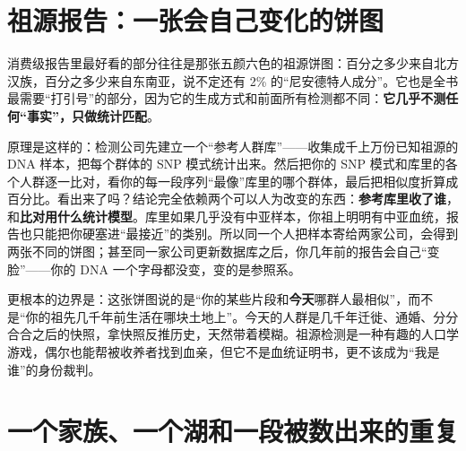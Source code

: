 \section{祖源报告：一张会自己变化的饼图}

消费级报告里最好看的部分往往是那张五颜六色的祖源饼图：百分之多少来自北方汉族，百分之多少来自东南亚，说不定还有 2\% 的“尼安德特人成分”。它也是全书最需要“打引号”的部分，因为它的生成方式和前面所有检测都不同：\textbf{它几乎不测任何“事实”，只做统计匹配}。

原理是这样的：检测公司先建立一个“参考人群库”——收集成千上万份已知祖源的 DNA 样本，把每个群体的 SNP 模式统计出来。然后把你的 SNP 模式和库里的各个人群逐一比对，看你的每一段序列“最像”库里的哪个群体，最后把相似度折算成百分比。看出来了吗？结论完全依赖两个可以人为改变的东西：\textbf{参考库里收了谁}，和\textbf{比对用什么统计模型}。库里如果几乎没有中亚样本，你祖上明明有中亚血统，报告也只能把你硬塞进“最接近”的类别。所以同一个人把样本寄给两家公司，会得到两张不同的饼图；甚至同一家公司更新数据库之后，你几年前的报告会自己“变脸”——你的 DNA 一个字母都没变，变的是参照系。

更根本的边界是：这张饼图说的是“你的某些片段和\textbf{今天}哪群人最相似”，而不是“你的祖先几千年前生活在哪块土地上”。今天的人群是几千年迁徙、通婚、分分合合之后的快照，拿快照反推历史，天然带着模糊。祖源检测是一种有趣的人口学游戏，偶尔也能帮被收养者找到血亲，但它不是血统证明书，更不该成为“我是谁”的身份裁判。

\section{一个家族、一个湖和一段被数出来的重复}


